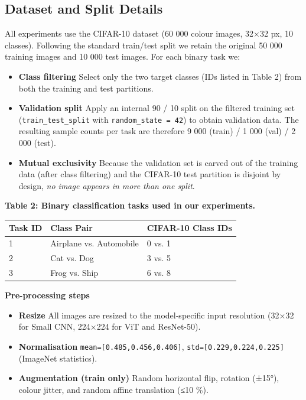 \documentclass[11pt]{article}
\begin{document}
\subsection{Dataset and Split Details}
All experiments use the CIFAR-10 dataset (60 000 colour images, 32×32 px, 10 classes). Following the standard train/test split we retain the original 50 000 training images and 10 000 test images. For each binary task we:
\begin{itemize}
\item \textbf{Class filtering} Select only the two target classes (IDs listed in Table 2) from both the training and test partitions.
\item \textbf{Validation split} Apply an internal 90 / 10 split on the filtered training set (\texttt{train\_test\_split} with \texttt{random\_state = 42}) to obtain validation data. The resulting sample counts per task are therefore 9 000 (train) / 1 000 (val) / 2 000 (test).
\item \textbf{Mutual exclusivity} Because the validation set is carved out of the training data (after class filtering) and the CIFAR-10 test partition is disjoint by design, \textit{no image appears in more than one split}.
\end{itemize}

\textbf{Table 2: Binary classification tasks used in our experiments.}

\begin{tabular}{lll}
\hline
Task ID & Class Pair & CIFAR-10 Class IDs \\
\hline
1 & Airplane vs. Automobile & 0 vs. 1 \\
2 & Cat vs. Dog & 3 vs. 5 \\
3 & Frog vs. Ship & 6 vs. 8 \\
\hline
\end{tabular}

\textbf{Pre-processing steps}
\begin{itemize}
\item \textbf{Resize} All images are resized to the model‐specific input resolution (32×32 for Small CNN, 224×224 for ViT and ResNet-50).
\item \textbf{Normalisation} \texttt{mean=[0.485,0.456,0.406]}, \texttt{std=[0.229,0.224,0.225]} (ImageNet statistics).
\item \textbf{Augmentation (train only)} Random horizontal flip, rotation (±15°), colour jitter, and random affine translation (≤10 \%).
\end{itemize}
\end{document}
